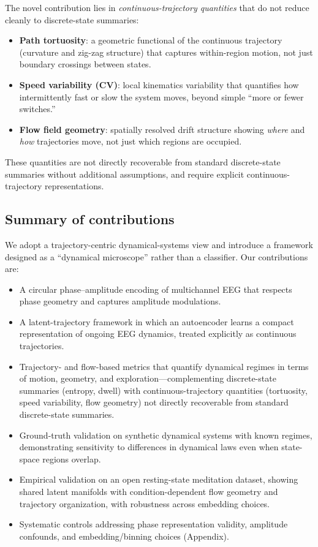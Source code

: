 \documentclass[5p,twocolumn,authoryear]{elsarticle}
\begin{document}
The novel contribution lies in \emph{continuous-trajectory quantities} that do not reduce cleanly to discrete-state summaries:
\begin{itemize}
    \item \textbf{Path tortuosity}: a geometric functional of the continuous trajectory (curvature and zig-zag structure) that captures within-region motion, not just boundary crossings between states.
    \item \textbf{Speed variability (CV)}: local kinematics variability that quantifies how intermittently fast or slow the system moves, beyond simple ``more or fewer switches.''
    \item \textbf{Flow field geometry}: spatially resolved drift structure showing \emph{where} and \emph{how} trajectories move, not just which regions are occupied.
\end{itemize}
These quantities are not directly recoverable from standard discrete-state summaries without additional assumptions, and require explicit continuous-trajectory representations.

\subsection{Summary of contributions}

We adopt a trajectory-centric dynamical-systems view and introduce a framework designed as a ``dynamical microscope'' rather than a classifier. Our contributions are:
\begin{itemize}
    \item A circular phase--amplitude encoding of multichannel EEG that respects phase geometry and captures amplitude modulations.
    \item A latent-trajectory framework in which an autoencoder learns a compact representation of ongoing EEG dynamics, treated explicitly as continuous trajectories.
    \item Trajectory- and flow-based metrics that quantify dynamical regimes in terms of motion, geometry, and exploration---complementing discrete-state summaries (entropy, dwell) with continuous-trajectory quantities (tortuosity, speed variability, flow geometry) not directly recoverable from standard discrete-state summaries.
    \item Ground-truth validation on synthetic dynamical systems with known regimes, demonstrating sensitivity to differences in dynamical laws even when state-space regions overlap.
    \item Empirical validation on an open resting-state meditation dataset, showing shared latent manifolds with condition-dependent flow geometry and trajectory organization, with robustness across embedding choices.
    \item Systematic controls addressing phase representation validity, amplitude confounds, and embedding/binning choices (Appendix).
\end{itemize}
\end{document}
